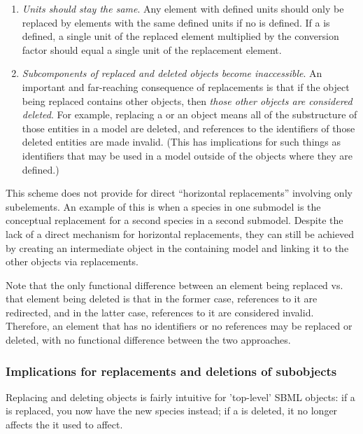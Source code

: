 \begin{enumerate}
\item \emph{Units should stay the same}.  Any element with defined units should only be replaced by elements with the same defined units if no  is defined.  If a  is defined, a single unit of the replaced element multiplied by the conversion factor should equal a single unit of the replacement element.

\item \emph{Subcomponents of replaced and deleted objects become inaccessible}.  An important and far-reaching consequence of replacements is that if the object being replaced contains other objects, then \emph{those other objects are considered deleted}.  For example, replacing a \Reaction or an \Event object means all of the substructure of those entities in a model are deleted, and references to the identifiers of those deleted entities are made invalid.  (This has implications for such things as \SpeciesReference identifiers that may be used in a model outside of the \Reaction objects where they are defined.)

\end{enumerate}

This scheme does not provide for direct ``horizontal replacements'' involving only subelements.  An example of this is when a species in one submodel is the conceptual replacement for a second species in a second submodel. Despite the lack of a direct mechanism for horizontal replacements, they can still be achieved by creating an intermediate object in the containing model and linking it to the other objects via replacements.

Note that the only functional difference between an element being replaced vs. that element being deleted is that in the former case, references to it are redirected, and in the latter case, references to it are  considered invalid.  Therefore, an element that has no identifiers or no references may be replaced or deleted, with no functional difference between the two approaches.

\subsubsection{Implications for replacements and deletions of subobjects}

Replacing and deleting objects is fairly intuitive for 'top-level' SBML objects: if a \Species is replaced, you now have the new species instead; if a \Reaction is deleted, it no longer affects the \Species it used to affect.

